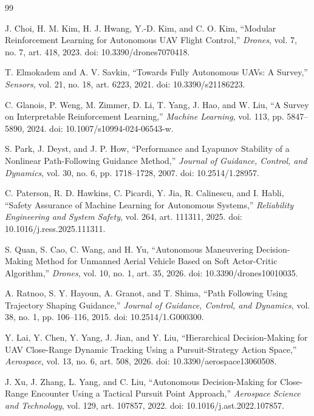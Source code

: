 \documentclass[drones,article,submit,pdftex,moreauthors]{Definitions/mdpi}
\begin{document}
\begin{thebibliography}{99}

J. Choi, H. M. Kim, H. J. Hwang, Y.-D. Kim, and C. O. Kim,
``Modular Reinforcement Learning for Autonomous UAV Flight Control,''
\emph{Drones}, vol. 7, no. 7, art. 418, 2023.
doi: 10.3390/drones7070418.

T. Elmokadem and A. V. Savkin,
``Towards Fully Autonomous UAVs: A Survey,''
\emph{Sensors}, vol. 21, no. 18, art. 6223, 2021.
doi: 10.3390/s21186223.

C. Glanois, P. Weng, M. Zimmer, D. Li, T. Yang, J. Hao, and W. Liu,
``A Survey on Interpretable Reinforcement Learning,''
\emph{Machine Learning}, vol. 113, pp. 5847--5890, 2024.
doi: 10.1007/s10994-024-06543-w.

S. Park, J. Deyst, and J. P. How,
``Performance and Lyapunov Stability of a Nonlinear Path-Following Guidance Method,''
\emph{Journal of Guidance, Control, and Dynamics}, vol. 30, no. 6, pp. 1718--1728, 2007.
doi: 10.2514/1.28957.

C. Paterson, R. D. Hawkins, C. Picardi, Y. Jia, R. Calinescu, and I. Habli,
``Safety Assurance of Machine Learning for Autonomous Systems,''
\emph{Reliability Engineering and System Safety}, vol. 264, art. 111311, 2025.
doi: 10.1016/j.ress.2025.111311.

S. Quan, S. Cao, C. Wang, and H. Yu,
``Autonomous Maneuvering Decision-Making Method for Unmanned Aerial Vehicle Based on Soft Actor-Critic Algorithm,''
\emph{Drones}, vol. 10, no. 1, art. 35, 2026.
doi: 10.3390/drones10010035.

A. Ratnoo, S. Y. Hayoun, A. Granot, and T. Shima,
``Path Following Using Trajectory Shaping Guidance,''
\emph{Journal of Guidance, Control, and Dynamics}, vol. 38, no. 1, pp. 106--116, 2015.
doi: 10.2514/1.G000300.

Y. Lai, Y. Chen, Y. Yang, J. Jian, and Y. Liu,
``Hierarchical Decision-Making for UAV Close-Range Dynamic Tracking Using a Pursuit-Strategy Action Space,''
\emph{Aerospace}, vol. 13, no. 6, art. 508, 2026.
doi: 10.3390/aerospace13060508.

J. Xu, J. Zhang, L. Yang, and C. Liu,
``Autonomous Decision-Making for Close-Range Encounter Using a Tactical Pursuit Point Approach,''
\emph{Aerospace Science and Technology}, vol. 129, art. 107857, 2022.
doi: 10.1016/j.ast.2022.107857.


\end{thebibliography}
\end{document}
